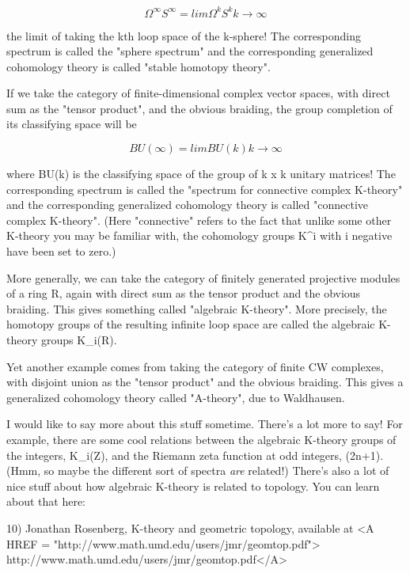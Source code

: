 $$

\Omega ^{\infty } S^{\infty }  =  lim  \Omega ^{k} S^{k}
         k \to  \infty 
$$
    

the limit of taking the kth loop space of the k-sphere!  The
corresponding spectrum is called the "sphere spectrum" and
the corresponding generalized cohomology theory is called "stable
homotopy theory".

If we take the category of finite-dimensional complex vector spaces,
with direct sum as the "tensor product", and the obvious
braiding, the group completion of its classifying space will be


$$

BU(\infty ) =   lim        BU(k)
              k \to  \infty 
$$
    

where BU(k) is the classifying space of the group of k x k unitary
matrices!  The corresponding spectrum is called the "spectrum for
connective complex K-theory" and the corresponding generalized
cohomology theory is called "connective complex K-theory".  (Here
"connective" refers to the fact that unlike some other K-theory you
may be familiar with, the cohomology groups K^{i} with i negative have
been set to zero.)

More generally, we can take the category of finitely generated
projective modules of a ring R, again
with direct sum as the tensor product and the obvious braiding.  This
gives something called "algebraic K-theory".  More precisely, the 
homotopy 
groups of the resulting infinite loop space are called the algebraic K-theory
groups K_{i}(R).  

Yet another example comes from taking the category of finite CW
complexes, with disjoint union as the "tensor product" and the obvious
braiding.  This gives a generalized cohomology theory called
"A-theory", due to Waldhausen.

I would like to say more about this stuff sometime.  There's a lot more 
to say!  For example, there are some cool relations between the algebraic 
K-theory groups of the integers, K_{i}(Z), and 
the Riemann zeta function at odd integers, \zeta (2n+1).
(Hmm, so maybe the different sort of spectra \emph{are} related!)  There's 
also a lot of nice stuff about how algebraic K-theory is related to topology.
You can learn about that here:

10) Jonathan Rosenberg, K-theory and geometric topology, available at
<A HREF = "http://www.math.umd.edu/users/jmr/geomtop.pdf">
http://www.math.umd.edu/users/jmr/geomtop.pdf</A>

